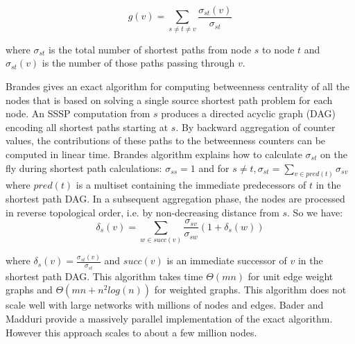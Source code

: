 \documentclass[runningheads,a4paper]{llncs}
\begin{document}
$$g(v) = \sum_{s \neq t \neq v} \frac{\sigma_{st}(v)}{\sigma_{st}}$$

where $\sigma_{st}$ is the total number of shortest paths from node $s$ to node $t$ and $\sigma_{st}(v)$ is the number of those paths passing through $v$.

Brandes\cite{brandes} gives an exact algorithm for computing betweenness centrality of all the nodes that is based on solving a single source shortest path problem for each node. An SSSP computation from $s$ produces a directed acyclic graph (DAG) encoding all shortest paths starting at $s$. By backward aggregation of counter values, the contributions of these paths to the betweenness counters can be computed in linear time. Brandes algorithm explains how to calculate $\sigma_{st}$ on the fly during shortest path calculations: $\sigma_{ss} = 1$ and for $s \neq t, \sigma_{st} = \sum_{v \in pred(t)} \sigma_{sv}$ where $pred(t)$ is a multiset containing the immediate predecessors of  $t$ in the shortest path DAG. In a subsequent aggregation phase, the nodes are processed in reverse topological order, i.e. by non-decreasing distance from $s$. So we have: 
$$\delta_{s}(v) = \sum_{w \in succ(v)} \frac{\sigma_{sv}}{\sigma_{sw}}(1+\delta_{s}(w))$$

where $\delta_{s}(v) = \frac{\sigma_{st}(v)}{\sigma_{st}}$ and $succ(v)$ is an immediate successor of $v$  in the shortest path DAG.   
This algorithm takes time $\Theta(mn)$ for unit edge weight graphs and $\Theta(mn + n^{2}log(n))$ for weighted graphs. This algorithm does not scale well with large networks with millions of nodes and edges. Bader and Madduri\cite{bader} provide a massively parallel implementation of the exact algorithm. However this approach scales to about a few million nodes. 
\end{document}
